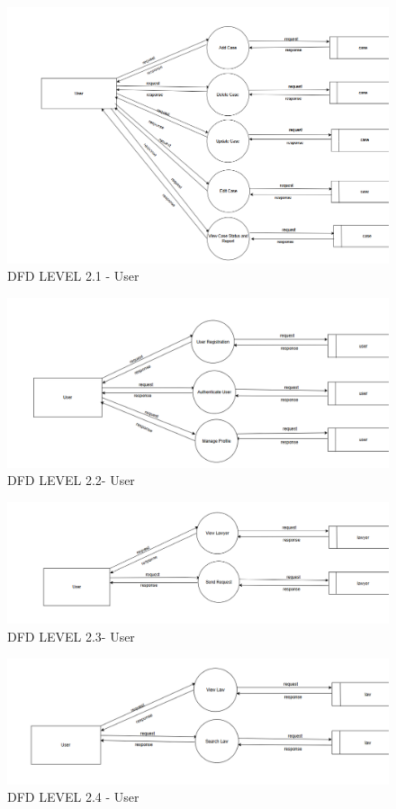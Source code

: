 \begin{figure}
  \centering
  \includegraphics[width=0.8\linewidth]{User2.1case.png}
 \caption{DFD LEVEL 2.1 - User}
   \label{fig:DFD LEVEL 2.1 - User}
\end{figure}

\begin{figure}
  \centering
  \includegraphics[width=0.8\linewidth]{User2.2user.png}
 \caption{DFD LEVEL 2.2- User}
   \label{fig:DFD LEVEL 2.2 - User}
\end{figure}

\begin{figure}
  \centering
  \includegraphics[width=0.8\linewidth]{User2.3lawyer.png}
 \caption{DFD LEVEL 2.3- User}
   \label{fig:DFD LEVEL 2.3 - User}
\end{figure}

\begin{figure}
  \centering
  \includegraphics[width=0.8\linewidth]{User2.4law.png}
 \caption{DFD LEVEL 2.4 - User}
   \label{fig:DFD LEVEL 2.4 - User}
\end{figure}

